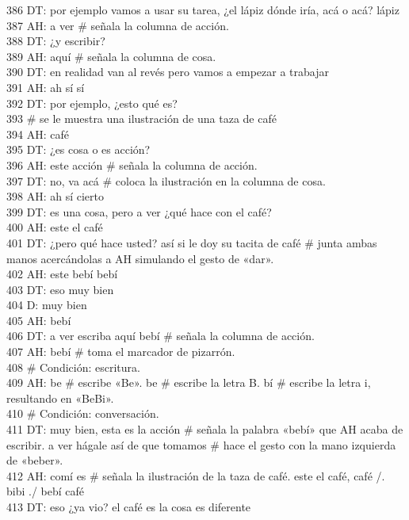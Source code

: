 386 DT: por ejemplo vamos a usar su tarea, ¿el lápiz dónde iría, acá o acá? lápiz\\
387 AH: a ver \# señala la columna de acción.\\
388 DT: ¿y escribir?\\
389 AH: aquí \# señala la columna de cosa.\\
390 DT: en realidad van al revés pero vamos a empezar a trabajar\\
391 AH: ah sí sí\\
392 DT: por ejemplo, ¿esto qué es?\\
393 \# se le muestra una ilustración de una taza de café\\
394 AH: café\\
395 DT: ¿es cosa o es acción?\\
396 AH: este acción \# señala la columna de acción.\\
397 DT: no, va acá # coloca la ilustración en la columna de cosa.\\
398 AH: ah sí cierto\\
399 DT: es una cosa, pero a ver ¿qué hace con el café?\\
400 AH: este el café\\
401 DT: ¿pero qué hace usted? así si le doy su tacita de café \# junta ambas manos acercándolas a AH simulando el gesto de «dar».\\
402 AH: este bebí bebí\\
403 DT: eso muy bien\\
404 D: muy bien\\
405 AH: bebí\\
406 DT: a ver escriba aquí bebí \# señala la columna de acción.\\
407 AH: bebí # toma el marcador de pizarrón.\\
408 \# Condición: escritura.\\
409 AH: be \# escribe «Be». be # escribe la letra B. bí # escribe la letra i, resultando en «BeBi».\\
410 \# Condición: conversación.\\
411 DT: muy bien, esta es la acción \# señala la palabra «bebí» que AH acaba de escribir. a ver hágale así de que tomamos \# hace el gesto con la mano izquierda de «beber».\\
412 AH: comí es \# señala la ilustración de la taza de café. este el café, café /. bibi ./ bebí café\\
413 DT: eso ¿ya vio? el café es la cosa es diferente\\
